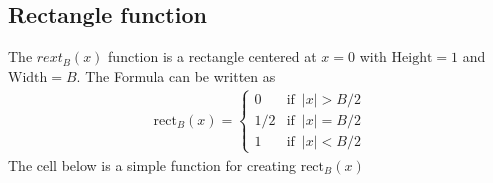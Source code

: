 \documentclass[letterpaper,10pt,english]{jupyterBook}
\begin{document}
\subsection{Rectangle function}
\label{\detokenize{fFy:rectangle-function}}
\sphinxAtStartPar
The \(rext_B(x)\) function is a rectangle centered at \(x=0\) with \(\text{Height}=1\) and \(\text{Width}=B\). The Formula can be written as
\begin{equation*}
\begin{split}
\text{rect}_B(x) =
\begin{cases}
0 & \text{if} \,\,\, |x| > B/2\\[2pt]
1/2 & \text{if} \,\,\, |x| = B/2 \\[2pt]
1 & \text{if} \,\,\, |x| < B/2
\end{cases}
\end{split}
\end{equation*}
\sphinxAtStartPar
The cell below is a simple function for creating \(\text{rect}_B(x)\)
\end{document}
